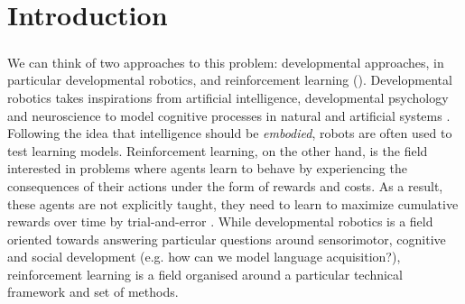 
\chapter{Introduction}
\paragraph{}We can think of two approaches to this problem: developmental approaches, in particular developmental robotics, and reinforcement learning (\rl). Developmental robotics takes inspirations from artificial intelligence, developmental psychology and neuroscience to model cognitive processes in natural and artificial systems \citep{asada2009cognitive,cangelosi2015developmental}. Following the idea that intelligence should be \textit{embodied}, robots are often used to test learning models. Reinforcement learning, on the other hand, is the field interested in problems where agents learn to behave by experiencing the consequences of their actions under the form of rewards and costs. As a result, these agents are not explicitly taught, they need to learn to maximize cumulative rewards over time by trial-and-error \citep{sutton2018reinforcement}. While developmental robotics is a field oriented towards answering particular questions around sensorimotor, cognitive and social development (e.g. how can we model language acquisition?), reinforcement learning is a field organised around a particular technical framework and set of methods.

\clearpage



